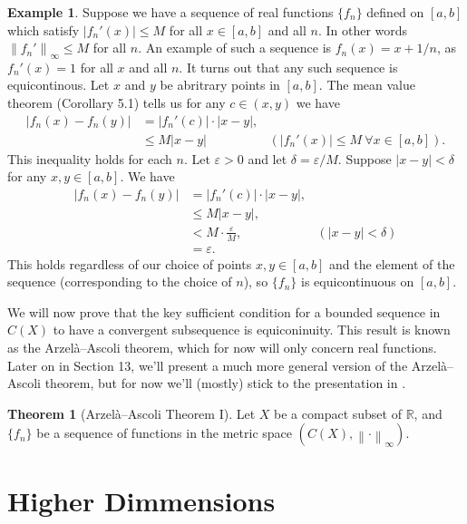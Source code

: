 \documentclass{article}
\newcommand{\R}{\mathbb{R}}
\newcommand{\norm}[1]{\left\lVert#1\right\rVert}
\newcommand{\abs}[1]{\left\lvert#1\right\rvert}
\theoremstyle{definition}
\newtheorem{theorem}{Theorem}[section]
\newtheorem{example}{Example}[section]
\begin{document}
	\begin{example}
		Suppose we have a sequence of real functions $\{f_n\}$ defined on $[a,b]$ which satisfy $\abs{f_n'(x)} \le M$ for all $x\in[a,b]$ and all $n$. In other words $\norm{f_n'}_\infty \le  M$ for all $n$. An example of such a sequence is $f_n(x) = x + 1/n$, as $f_n'(x) = 1$ for all $x$ and all $n$. It turns out that any such sequence is equicontinous.  Let $x$ and $y$ be abritrary points in $[a,b]$. The mean value theorem (Corollary 5.1) tells us for any $c\in(x,y)$ we have 
		\begin{align*}
			\abs{f_n(x) - f_n(y)} &= \abs{f_n'(c)}\cdot \abs{x-y},\\ 
		 & \le M \abs{x-y} & (\abs{f_n'(x)} \le M\ \forall x\in[a,b]) .
		\end{align*}
		This inequality holds for each $n$. Let $\varepsilon > 0$ and let $\delta = \varepsilon /M$. Suppose $\abs{x-y}<\delta$ for any $x,y\in[a,b]$. We have 
		\begin{align*}
			\abs{f_n(x) - f_n(y)} &= \abs{f_n'(c)}\cdot \abs{x-y},\\ 
			& \le M \abs{x-y}, \\
			& < M\cdot\frac{\varepsilon}{M}, & (\abs{x-y}<\delta)\\
			& = \varepsilon.
		\end{align*}
	This holds regardless of our choice of points $x,y\in[a,b]$ and the element of the sequence (corresponding to the choice of $n$), so $\{f_n\}$ is equicontinuous on $[a,b]$.
	\end{example}

	We will now prove that the key sufficient condition for a bounded sequence in $C(X)$  to have a convergent subsequence is equiconinuity. This result is known as the Arzelà–Ascoli theorem, which for now will only concern real functions. Later on in Section 13, we'll present a much more general version of the Arzelà–Ascoli theorem, but for now we'll (mostly) stick to the presentation in  \cite{rudin1964principles}.
	
	\begin{theorem}[Arzelà–Ascoli Theorem I]
		Let $X$ be a compact subset of $\R$, and $\{f_n\}$ be a sequence of functions in the metric space $(C(X), \norm{\cdot}_\infty)$.
	\end{theorem}
	
	\part{Higher Dimmensions}
	
\end{document}
